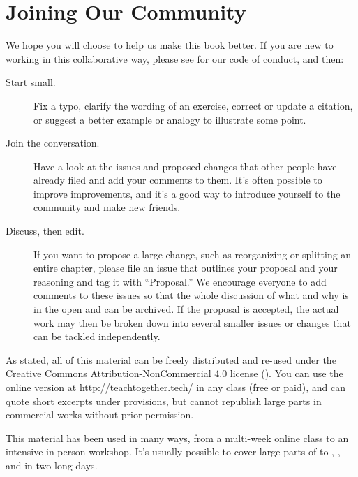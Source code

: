\chapter{Joining Our Community}\label{s:joining}

We hope you will choose to help us make this book better.
If you are new to working in this collaborative way,
please see  for our code of conduct,
and then:

\begin{description}

\item[Start small.]
  Fix a typo,
  clarify the wording of an exercise,
  correct or update a citation,
  or suggest a better example or analogy to illustrate some point.

\item[Join the conversation.]
  Have a look at the issues and proposed changes that other people have already filed
  and add your comments to them.
  It's often possible to improve improvements,
  and it's a good way to introduce yourself to the community and make new friends.

\item[Discuss, then edit.]
  If you want to propose a large change,
  such as reorganizing or splitting an entire chapter,
  please file an issue that outlines your proposal and your reasoning and tag it with ``Proposal.''
  We encourage everyone to add comments to these issues
  so that the whole discussion of what and why is in the open and can be archived.
  If the proposal is accepted,
  the actual work may then be broken down into several smaller issues or changes
  that can be tackled independently.

\end{description}


As  stated,
all of this material can be freely distributed and re-used
under the Creative Commons Attribution-NonCommercial 4.0 license
().
You can use the online version at \url{http://teachtogether.tech/} in any class (free or paid),
and can quote short excerpts under  provisions,
but cannot republish large parts in commercial works without prior permission.

This material has been used in many ways,
from a multi-week online class to an intensive in-person workshop.
It's usually possible to cover large parts of  to ,
,
and  in two long days.

